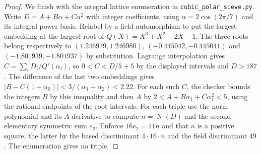 \documentclass[11pt,a4paper]{article}
\numberwithin{equation}{section}
\begin{document}
\begin{proof}
We finish with the integral lattice enumeration in \texttt{cubic\_polar\_sieve.py}. Write $D=A+B\alpha+C\alpha^2$ with integer
coefficients, using $\alpha=2\cos(2\pi/7)$ and its integral
power basis. Relabel by a field automorphism to put the largest
embedding at the largest root of $Q(X)=X^3+X^2-2X-1$.
The three roots belong respectively to
$(1.246979,1.246980)$, $(-0.445042,-0.445041)$ and
$(-1.801939,-1.801937)$ by substitution.
Lagrange interpolation gives $C=\sum_i D_i/Q'(\alpha_i)$,
so $0<C<D/5+5$ by the displayed intervals and $D>187$. The difference of the last two embeddings gives
$|B-C(1+\alpha_0)|<3/(\alpha_1-\alpha_2)<2.22$.
For each such $C$, the checker bounds the integers $B$ by this inequality and then $A$ by $2<A+B\alpha_1+C\alpha_1^2<5$, using the rational endpoints of the root intervals. For each triple use the norm polynomial and its $A$-derivative to
compute $n=\operatorname N(D)$ and the second elementary symmetric
sum $e_2$. Enforce $16e_2=11n$ and that $n$ is a positive square,
the latter by the based discriminant $4\cdot16\cdot n$ and the
field discriminant $49$. The enumeration gives no triple.
\end{proof}
\end{document}
